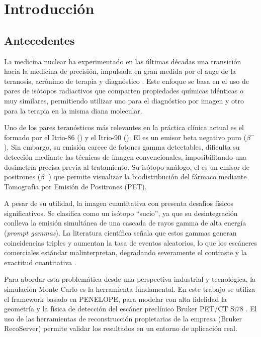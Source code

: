 \chapter{Introducción}
\label{cap:introduccion}


\section{Antecedentes}
\label{sec:introduccion:antecedentes}

La medicina nuclear ha experimentado en las últimas décadas una transición hacia la medicina de precisión, impulsada en gran medida
por el auge de la teranosis, acrónimo de terapia y diagnóstico \parencite{Rsch2017}. Este enfoque se basa en el uso de pares de isótopos radiactivos que comparten propiedades químicas idénticas o muy similares, permitiendo utilizar uno para el diagnóstico por
imagen y otro para la terapia en la misma diana molecular.

Uno de los pares teranósticos más relevantes en la práctica clínica actual es el formado por el Itrio-86 (\yochoseis) y el
Itrio-90 (\ynuevecero). El \ynuevecero es un emisor beta negativo puro ($\beta^-$). Sin embargo, su emisión carece de
fotones gamma detectables, dificulta su detección mediante las técnicas de imagen convencionales, imposibilitando una dosimetría
precisa previa al tratamiento. Su isótopo análogo, el \yochoseis es un emisor de positrones ($\beta^+$) que permite visualizar la
biodistribución del fármaco mediante Tomografía por Emisión de Positrones (PET).

A pesar de su utilidad, la imagen cuantitativa con \yochoseis presenta desafíos físicos significativos. Se clasifica como un
isótopo \enquote{sucio}, ya que su desintegración conlleva la emisión simultánea de una cascada de rayos gamma de alta
energía (\textit{prompt gammas}). La literatura científica \cite{Lubberink2011,Conti2016} señala que estos gammas generan
coincidencias triples y aumentan la tasa de eventos aleatorios, lo que los escáneres comerciales estándar malinterpretan,
degradando severamente el contraste y la exactitud cuantitativa \cite{Buchholz2003}.

Para abordar esta problemática desde una perspectiva industrial y tecnológica, la simulación Monte Carlo es la herramienta
fundamental. En este trabajo se utiliza el framework \penred \cite{Gimnez-Alventosa2021}
basado en PENELOPE, para modelar con alta fidelidad la geometría y la física de detección del escáner preclínico Bruker PET/CT Si78 \parencite{BrukerSi78}. El uso de las herramientas de reconstrucción propietarias de la empresa (Bruker RecoServer)
permite validar los resultados en un entorno de aplicación real.

